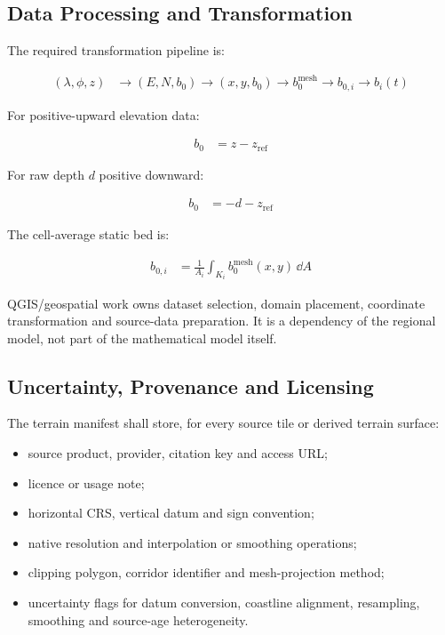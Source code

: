 \subsection{Data Processing and Transformation}
\label{sec:res-dat-geo-data-processing-transformation}

The required transformation pipeline is:

\begin{align}
  (\lambda,\phi,z)
  &\rightarrow
  (E,N,b_0)
  \rightarrow
  (x,y,b_0)
  \rightarrow
  b_0^{\mathrm{mesh}}
  \rightarrow
  b_{0,i}
  \rightarrow
  b_i(t)
  \label{eq:res-dat-geo-regional-bed-data-pipeline}
\end{align}

For positive-upward elevation data:

\begin{align}
  b_0
  &=
  z
  -
  z_{\mathrm{ref}}
  \label{eq:res-dat-geo-positive-upward-bed}
\end{align}

For raw depth $d$ positive downward:

\begin{align}
  b_0
  &=
  -d
  -
  z_{\mathrm{ref}}
  \label{eq:res-dat-geo-positive-downward-depth-conversion}
\end{align}

The cell-average static bed is:

\begin{align}
  b_{0,i}
  &=
  \frac{1}{A_i}
  \int_{K_i}
  b_0^{\mathrm{mesh}}(x,y)
  \,\dd A
  \label{eq:res-dat-geo-cell-average-static-bed}
\end{align}

QGIS/geospatial work owns dataset selection, domain placement,
coordinate transformation and source-data preparation. It is a
dependency of the regional model, not part of the mathematical model
itself.

\subsection{Uncertainty, Provenance and Licensing}
\label{sec:res-dat-geo-uncertainty-provenance-licensing}

The terrain manifest shall store, for every source tile or derived
terrain surface:

\begin{itemize}
  \item source product, provider, citation key and access URL;
  \item licence or usage note;
  \item horizontal CRS, vertical datum and sign convention;
  \item native resolution and interpolation or smoothing operations;
  \item clipping polygon, corridor identifier and mesh-projection
    method;
  \item uncertainty flags for datum conversion, coastline alignment,
    resampling, smoothing and source-age heterogeneity.
\end{itemize}

